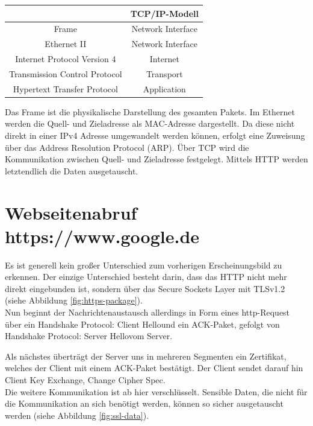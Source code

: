\documentclass[paper=a4, fontsize=11pt]{scrreprt}
\numberwithin{equation}{section}
\numberwithin{figure}{section}
\numberwithin{table}{section}
\begin{document}
\begin{center}
\begin{tabular}{|c|c|}
\hline 
 & \textbf{TCP/IP-Modell}\\ 
\hline 
Frame & Network Interface\\ 
\hline 
Ethernet II & Network Interface\\ 
\hline
Internet Protocol Version 4 & Internet\\ 
\hline
Transmission Control Protocol & Transport\\ 
\hline
Hypertext Transfer Protocol & Application\\ 
\hline 
\end{tabular}
\end{center}

Das Frame ist die physikalische Darstellung des gesamten Pakets. Im Ethernet werden die Quell- und Zieladresse als MAC-Adresse dargestellt. Da diese nicht direkt in einer IPv4 Adresse umgewandelt werden können, erfolgt eine Zuweisung über das Address Resolution Protocol (ARP). Über TCP wird die Kommunikation zwischen Quell- und Zieladresse festgelegt. Mittels HTTP werden letztendlich die Daten ausgetauscht.

\section{Webseitenabruf https://www.google.de}

Es ist generell kein großer Unterschied zum vorherigen Erscheinungsbild zu erkennen. Der einzige Unterschied besteht darin, dass das HTTP nicht mehr direkt eingebunden ist, sondern über das Secure Sockets Layer mit TLSv1.2 (siehe Abbildung \ref{fig:https-package}).\\

Nun beginnt der Nachrichtenaustausch allerdings in Form eines http-Request über ein \glqq Handshake Protocol: Client Hello\grqq und ein ACK-Paket, gefolgt von \glqq Handshake Protocol: Server Hello\grqq vom Server.

Als nächstes überträgt der Server uns in mehreren Segmenten ein Zertifikat, welches der Client mit einem ACK-Paket bestätigt. Der Client sendet darauf hin \glqq Client Key Exchange, Change Cipher Spec\grqq.\\

Die weitere Kommunikation ist ab hier verschlüsselt. Sensible Daten, die nicht für die Kommunikation an sich benötigt werden, können so sicher ausgetauscht werden (siehe Abbildung \ref{fig:ssl-data}).
\end{document}
